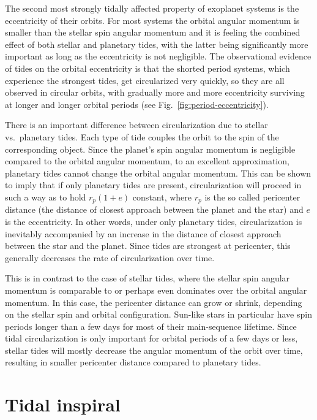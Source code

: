 The second most strongly tidally affected property of exoplanet systems is the
eccentricity of their orbits. For most systems the orbital angular momentum is
smaller than the stellar spin angular momentum and it is feeling the combined
effect of both stellar and planetary tides, with the latter being significantly
more important as long as the eccentricity is not negligible. The observational
evidence of tides on the orbital eccentricity is that the shorted period
systems, which experience the strongest tides, get circularized very quickly, so
they are all observed in circular orbits, with gradually more and more
eccentricity surviving at longer and longer orbital periods (see
Fig.~\ref{fig:period-eccentricity}).

There is an important difference between circularization due to stellar vs.\
planetary tides. Each type of tide couples the orbit to the spin of the
corresponding object. Since the planet's spin angular momentum is negligible
compared to the orbital angular momentum, to an excellent approximation,
planetary tides cannot change the orbital angular momentum. This can be shown to
imply that if only planetary tides are present, circularization will proceed in
such a way as to hold $r_p(1+e)$ constant, where $r_p$ is the so called
pericenter distance (the distance of closest approach between the planet and the
star) and $e$ is the eccentricity. In other words, under only planetary tides,
circularization is inevitably accompanied by an increase in the distance of
closest approach between the star and the planet. Since tides are strongest at
pericenter, this generally decreases the rate of circularization over time.

This is in contrast to the case of stellar tides, where the stellar spin angular
momentum is comparable to or perhaps even dominates over the orbital angular
momentum. In this case, the pericenter distance can grow or shrink, depending on
the stellar spin and orbital configuration. Sun-like stars in particular have
spin periods longer than a few days for most of their main-sequence lifetime.
Since tidal circularization is only important for orbital periods of a few days
or less, stellar tides will mostly decrease the angular momentum of the orbit
over time, resulting in smaller pericenter distance compared to planetary
tides.

\section{Tidal inspiral}

